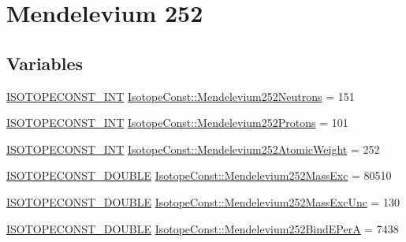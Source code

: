 \hypertarget{group___isotope_const-_mendelevium-_md252}{}\section{Mendelevium 252}
\label{group___isotope_const-_mendelevium-_md252}
\subsection*{Variables}
\begin{DoxyCompactItemize}
\item 
\mbox{\hyperlink{group___isotope_const-_macros_ga5f18360b3e99483a35c32d789e62621c}{I\+S\+O\+T\+O\+P\+E\+C\+O\+N\+S\+T\+\_\+\+I\+NT}} \mbox{\hyperlink{group___isotope_const-_mendelevium-_md252_ga45c80ffbb72beff9a03b44bdcf385572}{Isotope\+Const\+::\+Mendelevium252\+Neutrons}} = 151
\item 
\mbox{\hyperlink{group___isotope_const-_macros_ga5f18360b3e99483a35c32d789e62621c}{I\+S\+O\+T\+O\+P\+E\+C\+O\+N\+S\+T\+\_\+\+I\+NT}} \mbox{\hyperlink{group___isotope_const-_mendelevium-_md252_ga347c0ca5c74e95741dabaa94b736e6c4}{Isotope\+Const\+::\+Mendelevium252\+Protons}} = 101
\item 
\mbox{\hyperlink{group___isotope_const-_macros_ga5f18360b3e99483a35c32d789e62621c}{I\+S\+O\+T\+O\+P\+E\+C\+O\+N\+S\+T\+\_\+\+I\+NT}} \mbox{\hyperlink{group___isotope_const-_mendelevium-_md252_ga0f78845384523c2448f93586f92439c1}{Isotope\+Const\+::\+Mendelevium252\+Atomic\+Weight}} = 252
\item 
\mbox{\hyperlink{group___isotope_const-_macros_ga8f45a7272ce02c0b4c65c44636ed719a}{I\+S\+O\+T\+O\+P\+E\+C\+O\+N\+S\+T\+\_\+\+D\+O\+U\+B\+LE}} \mbox{\hyperlink{group___isotope_const-_mendelevium-_md252_ga8b8c675839e2bd9d7ded776eb85e6892}{Isotope\+Const\+::\+Mendelevium252\+Mass\+Exc}} = 80510
\item 
\mbox{\hyperlink{group___isotope_const-_macros_ga8f45a7272ce02c0b4c65c44636ed719a}{I\+S\+O\+T\+O\+P\+E\+C\+O\+N\+S\+T\+\_\+\+D\+O\+U\+B\+LE}} \mbox{\hyperlink{group___isotope_const-_mendelevium-_md252_gaea504e12c44d8fc1a9fe2be97d6c0cc4}{Isotope\+Const\+::\+Mendelevium252\+Mass\+Exc\+Unc}} = 130
\item 
\mbox{\hyperlink{group___isotope_const-_macros_ga8f45a7272ce02c0b4c65c44636ed719a}{I\+S\+O\+T\+O\+P\+E\+C\+O\+N\+S\+T\+\_\+\+D\+O\+U\+B\+LE}} \mbox{\hyperlink{group___isotope_const-_mendelevium-_md252_ga9f3fcfd62a4610b320c27766f5d75ab3}{Isotope\+Const\+::\+Mendelevium252\+Bind\+E\+PerA}} = 7438

\end{DoxyCompactItemize}
